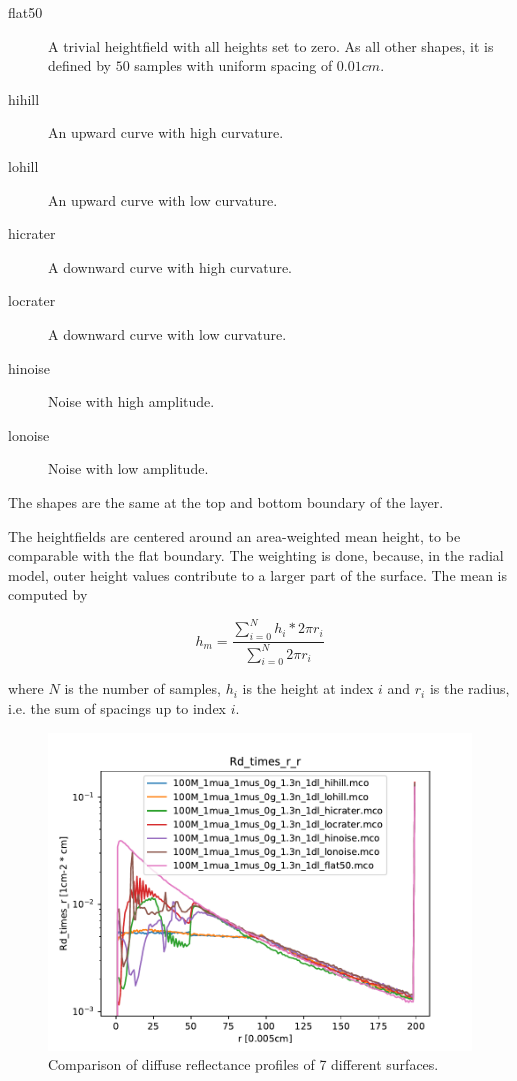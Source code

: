 \documentclass[]{article}
\begin{document}
\begin{description}
	\item[flat50] A trivial heightfield with all heights set to zero. As all other shapes, it is defined by $50$ samples with uniform spacing of $0.01cm$.
	\item[hihill] An upward curve with high curvature.
	\item[lohill] An upward curve with low curvature.
	\item[hicrater] A downward curve with high curvature.
	\item[locrater] A downward curve with low curvature.
	\item[hinoise] Noise with high amplitude.
	\item[lonoise] Noise with low amplitude.
\end{description}

The shapes are the same at the top and bottom boundary of the layer.

The heightfields are centered around an area-weighted mean height, to be comparable with the flat boundary. The weighting is done, because, in the radial model, outer height values contribute to a larger part of the surface. The mean is computed by

\begin{equation}
	h_m = \frac{\sum_{i=0}^{N}h_i * 2\pi r_i}{\sum_{i=0}^{N}2\pi r_i}
\end{equation}

where $N$ is the number of samples, $h_i$ is the height at index $i$ and $r_i$ is the radius, i.e. the sum of spacings up to index $i$.

\begin{figure}[ht!]
	\includegraphics[width=\linewidth]{img/result1.pdf}
	\caption{Comparison of diffuse reflectance profiles of 7 different surfaces.}
	\label{result1}
\end{figure}
\end{document}

